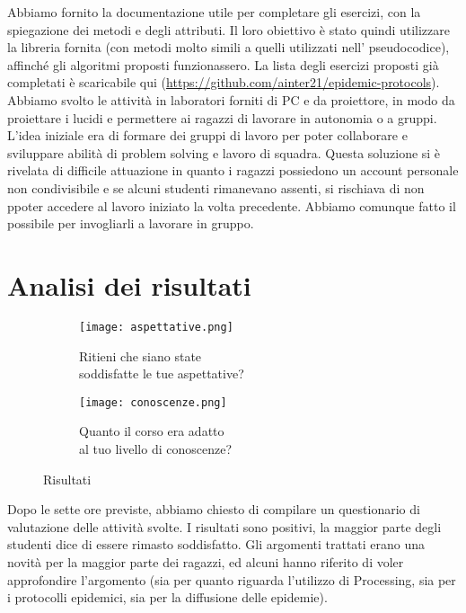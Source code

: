 Abbiamo fornito la documentazione utile per completare gli esercizi, con la spiegazione dei metodi e degli attributi. Il loro obiettivo è stato quindi utilizzare la libreria fornita (con metodi molto simili a quelli utilizzati nell' pseudocodice), affinché gli algoritmi proposti funzionassero. La lista degli esercizi proposti già completati è scaricabile qui (\href{https://github.com/ainter21/epidemic-protocols}{https://github.com/ainter21/epidemic-protocols}).
Abbiamo svolto le attività in laboratori forniti di PC e da proiettore, in modo da proiettare i lucidi e permettere ai ragazzi di lavorare in autonomia o a gruppi. L'idea iniziale era di formare dei gruppi di lavoro per poter collaborare e sviluppare abilità di problem solving e lavoro di squadra. Questa soluzione si  è rivelata di difficile attuazione in quanto i ragazzi possiedono un account personale non condivisibile e se alcuni studenti rimanevano assenti, si rischiava di non ppoter accedere al lavoro iniziato la volta precedente. Abbiamo comunque fatto il possibile per invogliarli a lavorare in gruppo.
\section{Analisi dei risultati}

\begin{figure}[h]
    
    \begin{subfigure}{.5\textwidth}
        \centering
        \texttt{[image: aspettative.png]}
        \captionsetup{justification=centering}
        \caption{Ritieni che siano state \\ soddisfatte le tue aspettative?} 
    \end{subfigure}
    \begin{subfigure}{.5\textwidth}
        \centering
        \texttt{[image: conoscenze.png]}
        \captionsetup{justification=centering}
        \caption{Quanto il corso era adatto  \\ al tuo livello di conoscenze?} 
    \end{subfigure}
    \caption{Risultati}
\end{figure} 

Dopo le sette ore previste, abbiamo chiesto di compilare un questionario di valutazione delle attività svolte. I risultati sono positivi, la maggior parte degli studenti dice di essere rimasto soddisfatto. Gli argomenti trattati erano una novità per la maggior parte dei ragazzi, ed alcuni hanno riferito di voler approfondire l'argomento (sia per quanto riguarda l'utilizzo di Processing, sia per i protocolli epidemici, sia per la diffusione delle epidemie). 